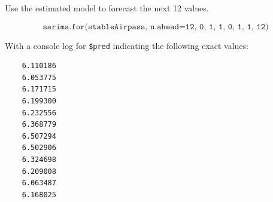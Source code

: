 Use the estimated model to forecast the next 12 values.

$$\texttt{sarima.for(stableAirpass, n.ahead=12, 0, 1, 1, 0, 1, 1, 12)}$$


With a console log for \texttt{\$pred} indicating the following exact values:
\begin{verbatim}
    6.110186
    6.053775
    6.171715
    6.199300
    6.232556
    6.368779
    6.507294
    6.502906
    6.324698
    6.209008
    6.063487
    6.168025
\end{verbatim}